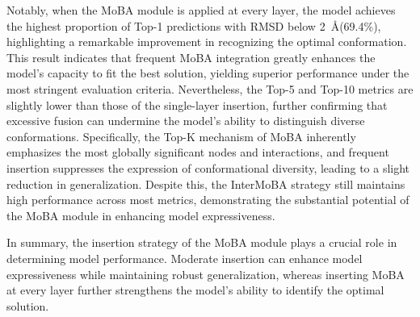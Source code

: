 \documentclass[lettersize,journal]{IEEEtran}
\begin{document}
Notably, when the MoBA module is applied at every layer, the model achieves the highest proportion of Top-1 predictions with RMSD below 2~\AA (69.4\%), highlighting a remarkable improvement in recognizing the optimal conformation. This result indicates that frequent MoBA integration greatly enhances the model's capacity to fit the best solution, yielding superior performance under the most stringent evaluation criteria. Nevertheless, the Top-5 and Top-10 metrics are slightly lower than those of the single-layer insertion, further confirming that excessive fusion can undermine the model's ability to distinguish diverse conformations. Specifically, the Top-K mechanism of MoBA inherently emphasizes the most globally significant nodes and interactions, and frequent insertion suppresses the expression of conformational diversity, leading to a slight reduction in generalization. Despite this, the InterMoBA strategy still maintains high performance across most metrics, demonstrating the substantial potential of the MoBA module in enhancing model expressiveness.

In summary, the insertion strategy of the MoBA module plays a crucial role in determining model performance. Moderate insertion can enhance model expressiveness while maintaining robust generalization, whereas inserting MoBA at every layer further strengthens the model's ability to identify the optimal solution.
\end{document}
